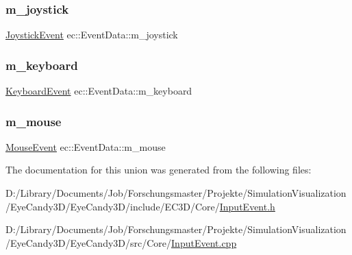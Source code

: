 \subsubsection{\texorpdfstring{m\+\_\+joystick}{m\_joystick}}
{\footnotesize\ttfamily \mbox{\hyperlink{structec_1_1_joystick_event}{Joystick\+Event}} ec\+::\+Event\+Data\+::m\+\_\+joystick}

\mbox{\label{unionec_1_1_event_data_a76d355d62f63e9947187e08bc520af45}} 
\subsubsection{\texorpdfstring{m\+\_\+keyboard}{m\_keyboard}}
{\footnotesize\ttfamily \mbox{\hyperlink{structec_1_1_keyboard_event}{Keyboard\+Event}} ec\+::\+Event\+Data\+::m\+\_\+keyboard}

\mbox{\label{unionec_1_1_event_data_a77d2274d869ab46f8f5f1e5d9616d4d3}} 
\subsubsection{\texorpdfstring{m\+\_\+mouse}{m\_mouse}}
{\footnotesize\ttfamily \mbox{\hyperlink{structec_1_1_mouse_event}{Mouse\+Event}} ec\+::\+Event\+Data\+::m\+\_\+mouse}



The documentation for this union was generated from the following files\+:\begin{DoxyCompactItemize}
\item 
D\+:/\+Library/\+Documents/\+Job/\+Forschungsmaster/\+Projekte/\+Simulation\+Visualization/\+Eye\+Candy3\+D/\+Eye\+Candy3\+D/include/\+E\+C3\+D/\+Core/\mbox{\hyperlink{_input_event_8h}{Input\+Event.\+h}}\item 
D\+:/\+Library/\+Documents/\+Job/\+Forschungsmaster/\+Projekte/\+Simulation\+Visualization/\+Eye\+Candy3\+D/\+Eye\+Candy3\+D/src/\+Core/\mbox{\hyperlink{_input_event_8cpp}{Input\+Event.\+cpp}}\end{DoxyCompactItemize}
